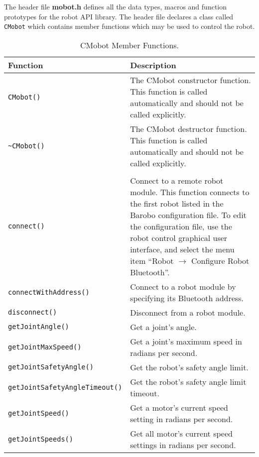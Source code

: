 \noindent
The header file {\bf mobot.h} defines all the data types, macros 
and function prototypes for the robot API library. The header file
declares a class called \texttt{CMobot} which contains member functions which
may be used to control the robot.

\begin{table}[!h]
\begin{center}
\caption{CMobot Member Functions.}
\begin{tabular}{p{48 mm}p{110 mm}}
\hline
Function & Description \\
\hline
\texttt{CMobot()} & The CMobot constructor function. This function
is called automatically and should not be called explicitly. \\
\texttt{\textasciitilde CMobot()} & The CMobot destructor function. This function
is called automatically and should not be called explicitly. \\
& \\
\texttt{connect()} & Connect to a remote robot module. This function 
connects to the first robot listed in the Barobo configuration file. To
edit the configuration file, use the robot control graphical user interface,
and select the menu item ``Robot $\rightarrow$ Configure Robot Bluetooth''. \\
\texttt{connectWithAddress()} & Connect to a robot module by specifying its Bluetooth address. \\
\texttt{disconnect()} & Disconnect from a robot module. \\
\texttt{getJointAngle()} & Get a joint's angle. \\
\texttt{getJointMaxSpeed()} & Get a joint's maximum speed in radians per second. \\
\texttt{getJointSafetyAngle()} & Get the robot's safety angle limit. \\
\texttt{getJointSafetyAngleTimeout()} & Get the robot's safety angle limit timeout. \\
\texttt{getJointSpeed()} & Get a motor's current speed setting in radians per second. \\
\texttt{getJointSpeeds()} & Get all motor's current speed settings in radians per second. \\

\end{tabular}
\end{center}
\end{table}
